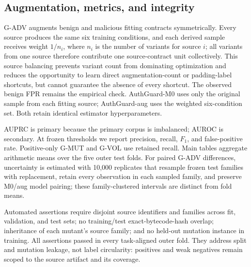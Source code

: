 \subsection{Augmentation, metrics, and integrity}

G-ADV augments benign and malicious fitting contracts symmetrically. Every source produces the same six training conditions, and each derived sample receives weight $1/n_i$, where $n_i$ is the number of variants for source $i$; all variants from one source therefore contribute one source-contract unit collectively. This source balancing prevents variant count from dominating optimization and reduces the opportunity to learn direct augmentation-count or padding-label shortcuts, but cannot guarantee the absence of every shortcut. The observed benign FPR remains the empirical check. AuthGuard-M0 uses only the original sample from each fitting source; AuthGuard-aug uses the weighted six-condition set. Both retain identical estimator hyperparameters.

AUPRC is primary because the primary corpus is imbalanced; AUROC is secondary. At frozen thresholds we report precision, recall, $F_1$, and false-positive rate. Positive-only G-MUT and G-VOL use retained recall. Main tables aggregate arithmetic means over the five outer test folds. For paired G-ADV differences, uncertainty is estimated with 10,000 replicates that resample frozen test families with replacement, retain every observation in each sampled family, and preserve M0/aug model pairing; these family-clustered intervals are distinct from fold means.

Automated assertions require disjoint source identifiers and families across fit, validation, and test sets; no training/test exact-bytecode-hash overlap; inheritance of each mutant's source family; and no held-out mutation instance in training. All assertions passed in every task-aligned outer fold. They address split and mutation leakage, not label circularity: positives and weak negatives remain scoped to the source artifact and its coverage.
